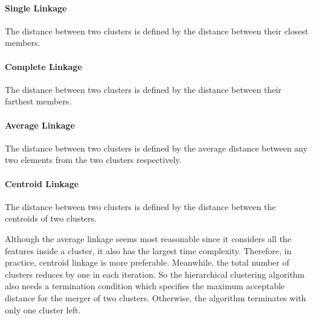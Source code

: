 \documentclass[twoside,11pt]{article}
\begin{document}
\paragraph{Single Linkage}
The distance between two clusters is defined by the distance between their closest members.
\paragraph{Complete Linkage}
The distance between two clusters is defined by the distance between their farthest members.
\paragraph{Average Linkage}
The distance between two clusters is defined by the average distance between any two elements from the two clusters respectively.
\paragraph{Centroid Linkage}
The distance between two clusters is defined by the distance between the centroids of two clusters.

Although the average linkage seems most reasonable since it considers all the features inside a cluster, it also has the largest time complexity. Therefore, in practice, centroid linkage is more preferable. Meanwhile, the total number of clusters reduces by one in each iteration. So the hierarchical clustering algorithm also needs a termination condition which specifies the maximum acceptable distance for the merger of two clusters. Otherwise, the algorithm terminates with only one cluster left.
\end{document}
